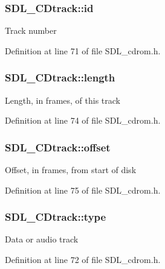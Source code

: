 \subsubsection[{id}]{ S\+D\+L\+\_\+\+C\+Dtrack\+::id}\label{struct_s_d_l___c_dtrack_aee8f951ef762bef0ab46e7424ad6c6a4}
Track number 

Definition at line 71 of file S\+D\+L\+\_\+cdrom.\+h.

\hypertarget{struct_s_d_l___c_dtrack_a15ae81e65a360c3a334e4323af6f2da5}{}
\subsubsection[{length}]{ S\+D\+L\+\_\+\+C\+Dtrack\+::length}\label{struct_s_d_l___c_dtrack_a15ae81e65a360c3a334e4323af6f2da5}
Length, in frames, of this track 

Definition at line 74 of file S\+D\+L\+\_\+cdrom.\+h.

\hypertarget{struct_s_d_l___c_dtrack_a5c0875650889c529cefee6c2684901f5}{}
\subsubsection[{offset}]{ S\+D\+L\+\_\+\+C\+Dtrack\+::offset}\label{struct_s_d_l___c_dtrack_a5c0875650889c529cefee6c2684901f5}
Offset, in frames, from start of disk 

Definition at line 75 of file S\+D\+L\+\_\+cdrom.\+h.

\hypertarget{struct_s_d_l___c_dtrack_adc74ef4de78c8418f229e3efd24a076f}{}
\subsubsection[{type}]{ S\+D\+L\+\_\+\+C\+Dtrack\+::type}\label{struct_s_d_l___c_dtrack_adc74ef4de78c8418f229e3efd24a076f}
Data or audio track 

Definition at line 72 of file S\+D\+L\+\_\+cdrom.\+h.

